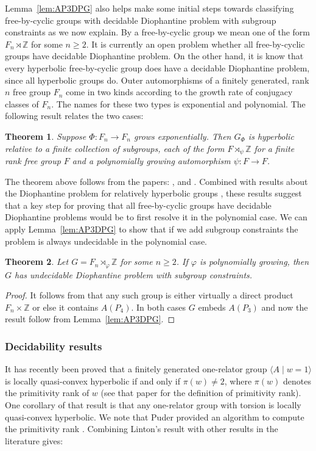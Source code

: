 \documentclass[11pt]{amsart}
\newtheorem{theorem}{Theorem}[section]
\theoremstyle{definition}
\numberwithin{theorem}{section}
\newcommand{\Z}{\mathbb{Z}}
\begin{document}
Lemma~\ref{lem:AP3DPG} also helps make some initial steps towards classifying
free-by-cyclic groups with decidable Diophantine problem with subgroup
constraints as we now explain. By a free-by-cyclic group we mean one of the
form $F_n \rtimes \Z$ for some $n \geq 2$. It is currently an open problem
whether all free-by-cyclic groups have decidable Diophantine problem. On the
other hand, it is know that every hyperbolic free-by-cyclic group does have a
decidable Diophantine problem, since all hyperbolic groups do.
Outer automorphisms of a finitely generated, rank $n$ free group $F_n$ come in two kinds according to the growth rate of conjugacy classes of $F_n$. The names for these two types is exponential and polynomial. The following result relates the two cases:    

\begin{theorem} Suppose $\Phi \colon F_n \rightarrow F_n$ grows exponentially. Then $G_\Phi$ is hyperbolic relative to a finite collection of subgroups, each of the form $F \rtimes_{\psi} \Z$ for a finite rank free group $F$ and a polynomially growing automorphism $\psi: F \rightarrow F$. \end{theorem}

The theorem above follows from the papers: \cite{gautero2007mapping},
\cite{Ghosh23} and \cite{DahmaniRuoyu}. Combined with results about the
Diophantine problem for relatively hyperbolic groups \cite{Dahmani}, 
these results suggest that a key step for proving that all free-by-cyclic groups have decidable
Diophantine problems would be to first resolve it in the polynomial case. We can
apply Lemma~\ref{lem:AP3DPG} to show that if we add subgroup constraints the
problem is always undecidable in the polynomial case.  

\begin{theorem}\label{thm:FBCPolynomial}
Let $G=F_n \rtimes_\varphi \mathbb{Z}$ for some $n \geq 2$. If \(\varphi\) is polynomially growing, then \(G\) has undecidable Diophantine problem with subgroup constraints.
\end{theorem}
\begin{proof} It follows from \cite[Theorem~3.4]{kudlinska2024subgroup} 
that any such group is either virtually a direct product $F_n \times \Z$ or else it contains $A(P_4)$. In both cases $G$ embeds $A(P_3)$ and now the result follow from Lemma~\ref{lem:AP3DPG}. \end{proof}
 
\subsubsection*{Decidability results} It has recently been proved 
\cite{linton2025geometry} that a finitely generated one-relator group $\langle A \mid w=1 \rangle$ is locally quasi-convex hyperbolic if and only if $\pi(w) \neq 2$, where $\pi(w)$ denotes the primitivity rank of $w$ (see that paper for the definition of primitivity rank). 
One corollary of that result is that any one-relator group with torsion is locally quasi-convex hyperbolic. We note that Puder provided an algorithm to compute the primitivity rank \cite{puder2014primitive}. 
Combining Linton's result with other results in the literature \cite{dahmani_guirardel} gives: 
\end{document}
